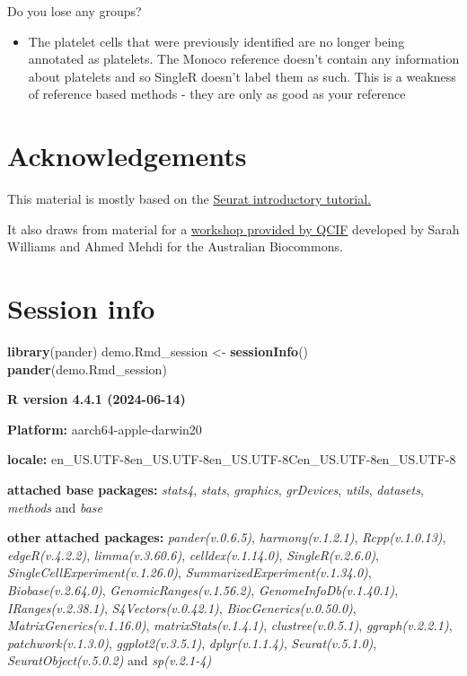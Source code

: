 \documentclass[
]{book}
\newenvironment{Shaded}{\begin{snugshade}}{\end{snugshade}}
\newcommand{\FunctionTok}[1]{\textcolor[rgb]{0.13,0.29,0.53}{\textbf{#1}}}
\newcommand{\NormalTok}[1]{#1}
\newcommand{\OtherTok}[1]{\textcolor[rgb]{0.56,0.35,0.01}{#1}}
\providecommand{\tightlist}{%
  \setlength{\itemsep}{0pt}\setlength{\parskip}{0pt}}
\begin{document}
Do you lose any groups?

\begin{itemize}
\tightlist
\item
  The platelet cells that were previously identified are no longer being annotated as platelets. The Monoco reference doesn't contain any information about platelets and so SingleR doesn't label them as such. This is a weakness of reference based methods - they are only as good as your reference
\end{itemize}

\chapter{Acknowledgements}\label{acknowledgements}

This material is mostly based on the \href{https://satijalab.org/seurat/articles/pbmc3k_tutorial.html}{Seurat introductory tutorial.}

It also draws from material for a \href{https://swbioinf.github.io/scRNAseqInR_Doco/index.html}{workshop provided by QCIF} developed by Sarah Williams and Ahmed Mehdi for the Australian Biocommons.

\chapter{Session info}\label{session-info}

\begin{Shaded}
\begin{Highlighting}[]

\FunctionTok{library}\NormalTok{(pander)}
\NormalTok{demo.Rmd\_session }\OtherTok{\textless{}{-}} \FunctionTok{sessionInfo}\NormalTok{()}
\FunctionTok{pander}\NormalTok{(demo.Rmd\_session)}
\end{Highlighting}
\end{Shaded}

\textbf{R version 4.4.1 (2024-06-14)}

\textbf{Platform:} aarch64-apple-darwin20

\textbf{locale:}
en\_US.UTF-8\textbar\textbar en\_US.UTF-8\textbar\textbar en\_US.UTF-8\textbar\textbar C\textbar\textbar en\_US.UTF-8\textbar\textbar en\_US.UTF-8

\textbf{attached base packages:}
\emph{stats4}, \emph{stats}, \emph{graphics}, \emph{grDevices}, \emph{utils}, \emph{datasets}, \emph{methods} and \emph{base}

\textbf{other attached packages:}
\emph{pander(v.0.6.5)}, \emph{harmony(v.1.2.1)}, \emph{Rcpp(v.1.0.13)}, \emph{edgeR(v.4.2.2)}, \emph{limma(v.3.60.6)}, \emph{celldex(v.1.14.0)}, \emph{SingleR(v.2.6.0)}, \emph{SingleCellExperiment(v.1.26.0)}, \emph{SummarizedExperiment(v.1.34.0)}, \emph{Biobase(v.2.64.0)}, \emph{GenomicRanges(v.1.56.2)}, \emph{GenomeInfoDb(v.1.40.1)}, \emph{IRanges(v.2.38.1)}, \emph{S4Vectors(v.0.42.1)}, \emph{BiocGenerics(v.0.50.0)}, \emph{MatrixGenerics(v.1.16.0)}, \emph{matrixStats(v.1.4.1)}, \emph{clustree(v.0.5.1)}, \emph{ggraph(v.2.2.1)}, \emph{patchwork(v.1.3.0)}, \emph{ggplot2(v.3.5.1)}, \emph{dplyr(v.1.1.4)}, \emph{Seurat(v.5.1.0)}, \emph{SeuratObject(v.5.0.2)} and \emph{sp(v.2.1-4)}
\end{document}
